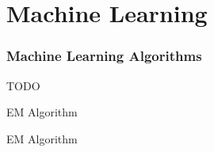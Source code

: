 \documentclass[12pt,oneside]{book}
\begin{document}
\pagestyle{empty}
\begin{multicols}{2}
  \tableofcontents
\end{multicols}
\part{Machine Learning}
\section{Machine Learning Algorithms}
















%
%
%

\newpage
TODO
\begin{description}
\item EM Algorithm
\item EM Algorithm
\end{description}
\end{document}
